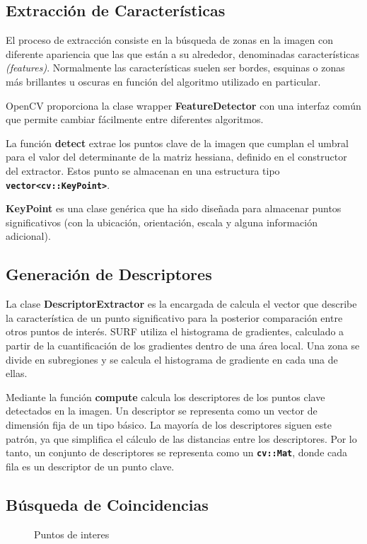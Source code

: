 \subsection{Extracción de Características}

El proceso de extracción consiste en la búsqueda de zonas en la imagen
con diferente apariencia que las que están a su alrededor, denominadas características \textit{(features)}. Normalmente las características suelen ser bordes, esquinas o zonas más brillantes u oscuras en
función del algoritmo utilizado en particular.

OpenCV proporciona la clase wrapper \textbf{FeatureDetector} con una interfaz común que permite
cambiar fácilmente entre diferentes algoritmos.


La función \textbf{detect} extrae los puntos clave de la imagen que
cumplan el umbral para el valor del determinante de la matriz
hessiana, definido en el constructor del extractor. Estos punto se
almacenan en una estructura tipo \textbf{\texttt{vector<cv::KeyPoint>}}.

\textbf{KeyPoint} es una clase genérica que ha sido diseñada para
almacenar puntos significativos (con la ubicación, orientación, escala
y alguna información adicional).

\subsection{Generación de Descriptores}
La clase \textbf{DescriptorExtractor} es la encargada de calcula
el vector que describe la característica de un punto significativo
para la posterior comparación entre otros puntos de interés. SURF
utiliza el histograma de gradientes, calculado a partir de la
cuantificación de los gradientes dentro de una área local. Una zona se divide
en subregiones y se calcula el histograma de gradiente en cada una de
ellas.

Mediante la función \textbf{compute} calcula los descriptores de los
puntos clave detectados en la imagen. Un descriptor se representa como
un vector de dimensión fija de un tipo básico. La mayoría de los
descriptores siguen este patrón, ya que simplifica el cálculo de las
distancias entre los descriptores. Por lo tanto, un conjunto de
descriptores se representa como un \textbf{\texttt{cv::Mat}}, donde cada fila
es un descriptor de un punto clave.

\subsection{Búsqueda de Coincidencias}
\begin{figure}[htbp]
\centering
{}
\caption{Puntos de interes} \label{fig:keypoints}
\end{figure}



